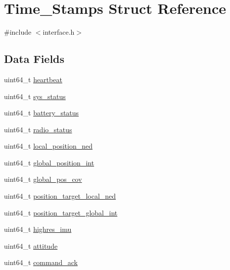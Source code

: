 \hypertarget{struct_time___stamps}{}\section{Time\+\_\+\+Stamps Struct Reference}
\label{struct_time___stamps}


{\ttfamily \#include $<$interface.\+h$>$}

\subsection*{Data Fields}
\begin{DoxyCompactItemize}
\item 
uint64\+\_\+t \hyperlink{struct_time___stamps_a0585817e699b46e384f5ccc2d122362a}{heartbeat}
\item 
uint64\+\_\+t \hyperlink{struct_time___stamps_a0c435af1e679e794a97d29f6ad8033c4}{sys\+\_\+status}
\item 
uint64\+\_\+t \hyperlink{struct_time___stamps_af6f0cc3b4549bdc74d9f5c3b01522877}{battery\+\_\+status}
\item 
uint64\+\_\+t \hyperlink{struct_time___stamps_a349d4b854b6448bec3938af7bb59a482}{radio\+\_\+status}
\item 
uint64\+\_\+t \hyperlink{struct_time___stamps_a39f9bcf43ad658301417a7aa3ae368bd}{local\+\_\+position\+\_\+ned}
\item 
uint64\+\_\+t \hyperlink{struct_time___stamps_a9bde3d252fe8abb20df512cfb8ed1879}{global\+\_\+position\+\_\+int}
\item 
uint64\+\_\+t \hyperlink{struct_time___stamps_a2e1be3841e043dd003c6d09b1d2fd6c0}{global\+\_\+pos\+\_\+cov}
\item 
uint64\+\_\+t \hyperlink{struct_time___stamps_a90cff6c62a9d017149d202852e3c7881}{position\+\_\+target\+\_\+local\+\_\+ned}
\item 
uint64\+\_\+t \hyperlink{struct_time___stamps_a6c9893fba620cfe3b8d8ff5ffd6a375b}{position\+\_\+target\+\_\+global\+\_\+int}
\item 
uint64\+\_\+t \hyperlink{struct_time___stamps_a05ee98180378af9ae38747893f5a4561}{highres\+\_\+imu}
\item 
uint64\+\_\+t \hyperlink{struct_time___stamps_ae5c3610ce264d2ccf7f529ae494ca474}{attitude}
\item 
uint64\+\_\+t \hyperlink{struct_time___stamps_aa52d5737fe1f692528b7ff03154399ea}{command\+\_\+ack}
\end{DoxyCompactItemize}


